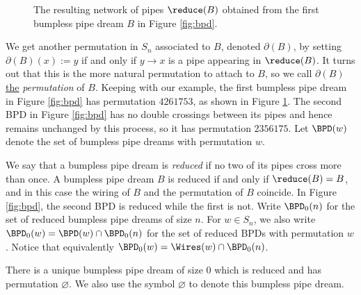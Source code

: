 \begin{figure}
    \centering

    
    \caption{The resulting network of pipes $\reduce(B)$ obtained from the first bumpless pipe dream $B$ in Figure \ref{fig:bpd}.}
    \label{fig:bpd_K}
\end{figure}

We get another permutation in $S_n$ associated to $B$, denoted $\partial(B)$, by setting $\partial(B)(x) := y$ if and only if $y\to x$ is a pipe appearing in $\reduce(B)$.
It turns out that this is the more natural permutation to attach to $B$, so we call $\partial(B)$ \underline{the} \textit{permutation} of $B$.
Keeping with our example, the first bumpless pipe dream in Figure \ref{fig:bpd} has permutation $4261753$, as shown in Figure \ref{fig:bpd_K}.
The second BPD in Figure \ref{fig:bpd} has no double crossings between its pipes and hence remains unchanged by this process, so it has permutation $2356175$.
Let $\BPD(w)$ denote the set of bumpless pipe dreams with permutation $w$.

We say that a bumpless pipe dream is \textit{reduced} if no two of its pipes cross more than once.
A bumpless pipe dream $B$ is reduced if and only if $\reduce(B) = B$, and in this case the wiring of $B$ and the permutation of $B$ coincide.
In Figure \ref{fig:bpd}, the second BPD is reduced while the first is not.
Write $\BPD_0(n)$ for the set of reduced bumpless pipe dreams of size $n$.
For $w\in S_n$, we also write $\BPD_0(w) = \BPD(w)\cap \BPD_0(n)$ for the set of reduced BPDs with permutation $w$.
Notice that equivalently $\BPD_0(w) = \Wires(w)\cap \BPD_0(n)$.

There is a unique bumpless pipe dream of size $0$ which is reduced and has permutation $\varnothing$.
We also use the symbol $\varnothing$ to denote this bumpless pipe dream.

